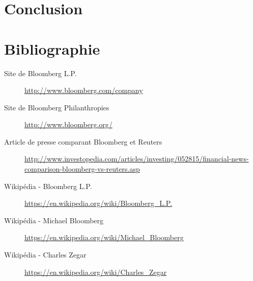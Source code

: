 \documentclass[11pt, oneside, titlepage, a4paper]{article}
\begin{document}
\section{Conclusion}
\newpage
\section{Bibliographie}
\begin{description}
\item[Site de Bloomberg L.P.] \url{http://www.bloomberg.com/company}
\item[Site de Bloomberg Philanthropies] \url{http://www.bloomberg.org/}
\item[Article de presse comparant Bloomberg et Reuters] \url{http://www.investopedia.com/articles/investing/052815/financial-news-comparison-bloomberg-vs-reuters.asp}
\item[Wikipédia - Bloomberg L.P.] \url{https://en.wikipedia.org/wiki/Bloomberg_L.P.}
\item[Wikipédia - Michael Bloomberg] \url{https://en.wikipedia.org/wiki/Michael_Bloomberg}
\item[Wikipédia - Charles Zegar] \url{https://en.wikipedia.org/wiki/Charles_Zegar}
\end{description}
\end{document}
